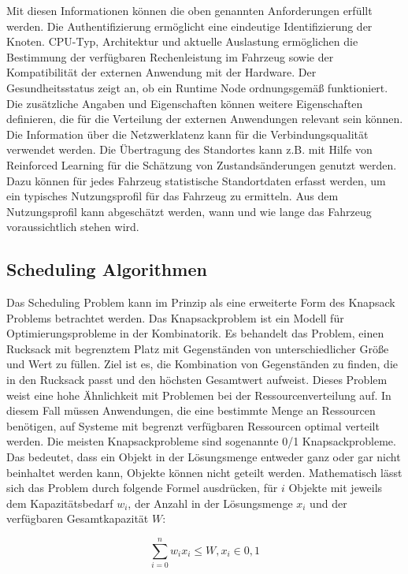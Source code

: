 Mit diesen Informationen können die oben genannten Anforderungen erfüllt werden. Die Authentifizierung ermöglicht eine eindeutige Identifizierung der Knoten. CPU-Typ, Architektur und aktuelle Auslastung ermöglichen die Bestimmung der verfügbaren Rechenleistung im Fahrzeug sowie der Kompatibilität der externen Anwendung mit der Hardware. Der Gesundheitsstatus zeigt an, ob ein Runtime Node ordnungsgemäß funktioniert. Die zusätzliche Angaben und Eigenschaften können weitere Eigenschaften definieren, die für die Verteilung der externen Anwendungen relevant sein können. Die Information über die Netzwerklatenz kann für die Verbindungsqualität verwendet werden. Die Übertragung des Standortes kann z.B. mit Hilfe von Reinforced Learning für die Schätzung von Zustandsänderungen genutzt werden. Dazu können für jedes Fahrzeug statistische Standortdaten erfasst werden, um ein typisches Nutzungsprofil für das Fahrzeug zu ermitteln. Aus dem Nutzungsprofil kann abgeschätzt werden, wann und wie lange das Fahrzeug voraussichtlich stehen wird. 

\subsection{Scheduling Algorithmen}

Das Scheduling Problem kann im Prinzip als eine erweiterte Form des Knapsack Problems betrachtet werden. Das Knapsackproblem ist ein Modell für Optimierungsprobleme in der Kombinatorik. Es behandelt das Problem, einen Rucksack mit begrenztem Platz mit Gegenständen von unterschiedlicher Größe und Wert zu füllen. Ziel ist es, die Kombination von Gegenständen zu finden, die in den Rucksack passt und den höchsten Gesamtwert aufweist. Dieses Problem weist eine hohe Ähnlichkeit mit Problemen bei der Ressourcenverteilung auf. In diesem Fall müssen Anwendungen, die eine bestimmte Menge an Ressourcen benötigen, auf Systeme mit begrenzt verfügbaren Ressourcen optimal verteilt werden. Die meisten Knapsackprobleme sind sogenannte 0/1 Knapsackprobleme. Das bedeutet, dass ein Objekt in der Lösungsmenge entweder ganz oder gar nicht beinhaltet werden kann, Objekte können nicht geteilt werden. Mathematisch lässt sich das Problem durch folgende Formel ausdrücken, für $ i $ Objekte mit jeweils dem Kapazitätsbedarf $ w_i $, der Anzahl in der Lösungsmenge $ x_i $ und der verfügbaren Gesamtkapazität $ W $:

\begin{equation}
    \sum_{i=0}^n w_i x_i  \leq W, x_i \in {0,1} 
    \label{Eq:Knapsack}
\end{equation}

